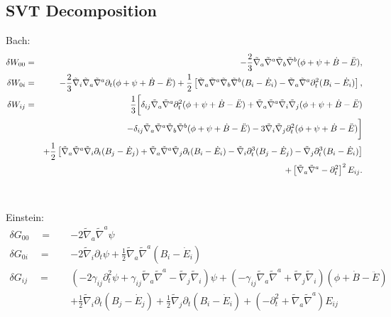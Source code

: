\documentclass[10pt,letterpaper]{article}
\numberwithin{equation}{subsection}
\begin{document}
\subsection{SVT Decomposition}
Bach:
\begin{eqnarray}
\delta W_{00}  &=& -\frac{2}{3} \tilde{\nabla}_a\tilde{\nabla}^a\tilde{\nabla}_b\tilde{\nabla}^b (\phi + \psi +\dot{B}-\ddot{E}),
\nonumber\\	
\delta W_{0i} &=&  -\frac{2}{3}\tilde{\nabla}_i\tilde{\nabla}_a\tilde{\nabla}^a\partial_t(\phi +\psi +\dot{B}-\ddot{E})
	+\frac{1}{2}\left[ \tilde{\nabla}_a\tilde{\nabla}^a\tilde{\nabla}_b\tilde{\nabla}^b(B_i - \dot{E}_i) -   \tilde{\nabla}_a\tilde{\nabla}^a \partial_t^2(B_i - \dot{E}_i)\right],
\nonumber\\	
\delta W_{ij}  &=& \frac{1}{3}\bigg{[} \delta_{ij}\tilde{\nabla}_a\tilde{\nabla}^a  \partial_t^2(\phi+ \psi+\dot{B}-\ddot{E}) +\tilde{\nabla}_a\tilde{\nabla}^a \tilde{\nabla}_i\tilde{\nabla}_j (\phi + \psi +\dot{B}-\ddot{E}) 
\nonumber\\
&&- \delta_{ij} \tilde{\nabla}_a\tilde{\nabla}^a\tilde{\nabla}_b\tilde{\nabla}^b(\phi + \psi +\dot{B}-\ddot{E}) -3\tilde{\nabla}_i\tilde{\nabla}_j \partial_t^2(\phi + \psi +\dot{B}-\ddot{E})\bigg{] }
\nonumber\\
&&+\frac{1}{2}\left[ \tilde{\nabla}_{a}\tilde{\nabla}^a \tilde{\nabla}_i   \partial_t(B_j - \dot{E}_j)+\tilde{\nabla}_{a}\tilde{\nabla}^a \tilde{\nabla}_j \partial_t(B_i - \dot{E}_i) - \tilde{\nabla}_i\partial_t^3(B_j - \dot{E}_j)-\tilde{\nabla}_j\partial_t^3(B_i - \dot{E}_i)\right]
\nonumber\\
&&+\left[\tilde{\nabla}_a\tilde{\nabla}^a-\partial_t^2\right]^2E_{ij}.
\end{eqnarray}
\\ \\
Einstein:
\begin{align}
\delta G_{00} \quad=\quad& -2 \tilde{\nabla}_{a}\tilde{\nabla}^{a}\psi
\nonumber\\
\delta G_{0i} \quad=\quad&  - 2 \tilde{\nabla}_{i}\partial_t \psi+\tfrac{1}{2} \tilde{\nabla}_{a}\tilde{\nabla}^{a}\left(B_{i} -\dot{E}_{i}\right)
\nonumber \\
\delta G_{ij}\quad=\quad&
 (- 2 \gamma_{ij}\partial_t^2 \psi 
+ \gamma_{ij} \tilde{\nabla}_{a}\tilde{\nabla}^{a}
 - \tilde{\nabla}_{j}\tilde{\nabla}_{i})\psi
 +( -  \gamma_{ij} \tilde{\nabla}_{a}\tilde{\nabla}^{a}
 + \tilde{\nabla}_{j}\tilde{\nabla}_{i})\left(\phi+\dot{B}-\ddot E\right)
\nonumber\\
& + \tfrac{1}{2} \tilde{\nabla}_{i}\partial_t\left(B_{j}-\dot E_j\right)
 + \tfrac{1}{2} \tilde{\nabla}_{j}\partial_t\left({B}_{i}-\dot E_i\right)
 +(- \partial_t^2+ \tilde{\nabla}_{a}\tilde{\nabla}^{a}){E}_{ij}
\end{align}
\end{document}
